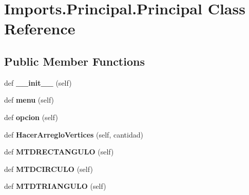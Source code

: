 \hypertarget{class_imports_1_1_principal_1_1_principal}{}\section{Imports.\+Principal.\+Principal Class Reference}
\label{class_imports_1_1_principal_1_1_principal}
\subsection*{Public Member Functions}
\begin{DoxyCompactItemize}
\item 
\mbox{\label{class_imports_1_1_principal_1_1_principal_ab4584824e61de88e435c8a6db58e81fc}} 
def {\bfseries \+\_\+\+\_\+init\+\_\+\+\_\+} (self)
\item 
\mbox{\label{class_imports_1_1_principal_1_1_principal_acc3ab870d562121bfc230c2709678aba}} 
def {\bfseries menu} (self)
\item 
\mbox{\label{class_imports_1_1_principal_1_1_principal_a423de8f65aa9bce0b30dc3eb4db5e1e6}} 
def {\bfseries opcion} (self)
\item 
\mbox{\label{class_imports_1_1_principal_1_1_principal_ada9da089d294a780fdc84c2db554f40c}} 
def {\bfseries Hacer\+Arreglo\+Vertices} (self, cantidad)
\item 
\mbox{\label{class_imports_1_1_principal_1_1_principal_a29cb7674a3fc313a0b46480d1977c1d7}} 
def {\bfseries M\+T\+D\+R\+E\+C\+T\+A\+N\+G\+U\+LO} (self)
\item 
\mbox{\label{class_imports_1_1_principal_1_1_principal_a440ccddd30dd46474b98c13b9127dfa2}} 
def {\bfseries M\+T\+D\+C\+I\+R\+C\+U\+LO} (self)
\item 
\mbox{\label{class_imports_1_1_principal_1_1_principal_ac5779377f4762c9493d9b746436694cf}} 
def {\bfseries M\+T\+D\+T\+R\+I\+A\+N\+G\+U\+LO} (self)
\end{DoxyCompactItemize}
